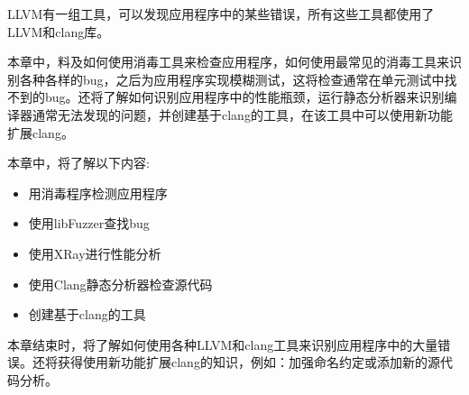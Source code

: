 LLVM有一组工具，可以发现应用程序中的某些错误，所有这些工具都使用了LLVM和clang库。

本章中，料及如何使用消毒工具来检查应用程序，如何使用最常见的消毒工具来识别各种各样的bug，之后为应用程序实现模糊测试，这将检查通常在单元测试中找不到的bug。还将了解如何识别应用程序中的性能瓶颈，运行静态分析器来识别编译器通常无法发现的问题，并创建基于clang的工具，在该工具中可以使用新功能扩展clang。

本章中，将了解以下内容:

\begin{itemize}
\item
用消毒程序检测应用程序

\item
使用libFuzzer查找bug

\item
使用XRay进行性能分析

\item
使用Clang静态分析器检查源代码

\item
创建基于clang的工具
\end{itemize}

本章结束时，将了解如何使用各种LLVM和clang工具来识别应用程序中的大量错误。还将获得使用新功能扩展clang的知识，例如：加强命名约定或添加新的源代码分析。
